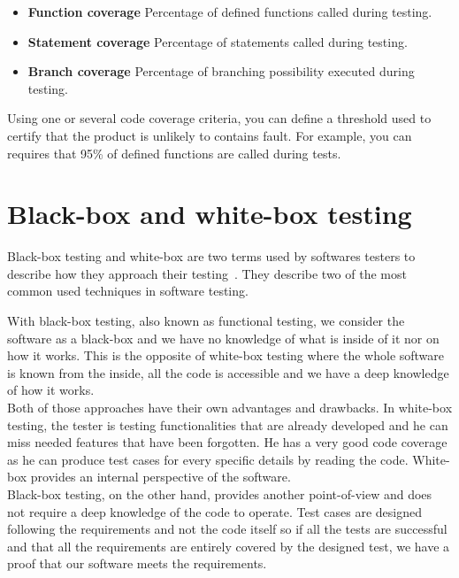 \documentclass[12pt]{article}
\theoremstyle{definition}
\theoremstyle{definition}
\theoremstyle{remark}
\begin{document}
\begin{itemize}
\item \textbf{Function coverage} Percentage of defined functions called during testing.
\item \textbf{Statement coverage} Percentage of statements called during testing.
\item \textbf{Branch coverage} Percentage of branching possibility executed during testing.
\end{itemize}

Using one or several code coverage criteria, you can define a threshold used to certify that the product is unlikely to contains fault. For example, you can requires that 95\% of defined functions are called during tests.



\section{Black-box and white-box testing}


Black-box testing and white-box are two terms used by softwares testers to describe how they approach their testing~\cite{Patton:2005}. They describe two of the most common used techniques in software testing.

With black-box testing, also known as functional testing, we consider the software as a black-box and we have no knowledge of what is inside of it nor on how it works. This is the opposite of white-box testing where the whole software is known from the inside, all the code is accessible and we have a deep knowledge of how it works.\\

Both of those approaches have their own advantages and drawbacks. In white-box testing, the tester is testing functionalities that are already developed and he can miss needed features that have been forgotten. He has a very good code coverage as he can produce test cases for every specific details by reading the code. White-box provides an internal perspective of the software.\\

Black-box testing, on the other hand, provides another point-of-view and does not require a deep knowledge of the code to operate. Test cases are designed following the requirements and not the code itself so if all the tests are successful and that all the requirements are entirely covered by the designed test, we have a proof that our software meets the requirements.\\
\end{document}
